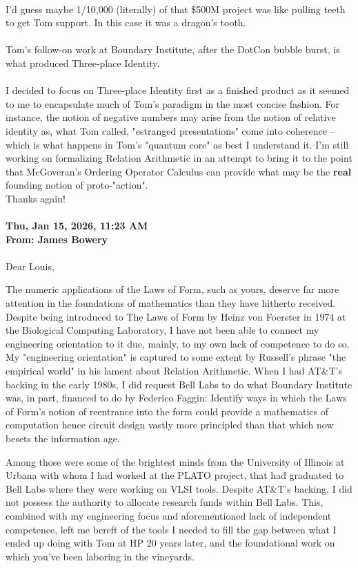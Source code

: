 \documentclass{ws-rv9x6}
\theoremstyle{remark}
\begin{document}
\begin{appendices}
\\
I'd guess maybe 1/10,000 (literally) of that \$500M project was like pulling teeth to get Tom support.  In this case it was a dragon's tooth. \\
\\
Tom's follow-on work at Boundary Institute, after the DotCon bubble burst, is what produced Three-place Identity. \\
\\
I decided to focus on Three-place Identity first as a finished product as it seemed to me to encapsulate much of Tom's paradigm in the most concise fashion.  For instance, the notion of negative numbers may arise from the notion of relative identity as, what Tom called, "estranged presentations" come into coherence -- which is what happens in Tom's "quantum core" as best I understand it.  I'm still working on formalizing Relation Arithmetic in an attempt to bring it to the point that McGoveran's Ordering Operator Calculus can provide what may be the \textbf{real} founding notion of proto-"action".
\\
Thanks again! \\
\\
\textbf{Thu, Jan 15, 2026, 11:23 AM \\
From: James Bowery \\}
\\
Dear Louis,

The numeric applications of the Laws of Form, such as yours, deserve far more attention in the foundations of mathematics than they have hitherto received.  Despite being introduced to The Laws of Form by Heinz von Foerster in 1974 at the Biological Computing Laboratory, I have not been able to connect my engineering orientation to it due, mainly, to my own lack of competence to do so.  My "engineering orientation" is captured to some extent by Russell's phrase "the empirical world" in his lament about Relation Arithmetic.  When I had AT&T's backing in the early 1980s, I did request Bell Labs to do what Boundary Institute was, in part, financed to do by Federico Faggin: Identify ways in which the Laws of Form's notion of reentrance into the form could provide a mathematics of computation hence circuit design vastly more principled than that which now besets the information age.  

Among those were some of the brightest minds from the University of Illinois at Urbana with whom I had worked at the PLATO project, that had graduated to Bell Labs where they were working on VLSI tools.  Despite AT&T's backing, I did not possess the authority to allocate research funds within Bell Labs.  This, combined with my engineering focus and aforementioned lack of independent competence, left me bereft of the tools I needed to fill the gap between what I ended up doing with Tom at HP 20 years later, and the foundational work on which you've been laboring in the vineyards.  


\end{appendices}
\end{document}
